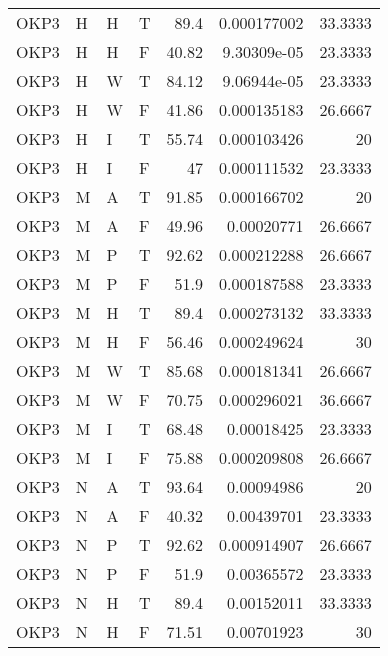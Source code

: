 \begin{longtable}{llllrrr}
    OKP3     & H     & H     & T          & 89.4       & 0.000177002 & 33.3333  \\
    OKP3     & H     & H     & F          & 40.82      & 9.30309e-05 & 23.3333  \\
    OKP3     & H     & W     & T          & 84.12      & 9.06944e-05 & 23.3333  \\
    OKP3     & H     & W     & F          & 41.86      & 0.000135183 & 26.6667  \\
    OKP3     & H     & I     & T          & 55.74      & 0.000103426 & 20       \\
    OKP3     & H     & I     & F          & 47         & 0.000111532 & 23.3333  \\
    OKP3     & M     & A     & T          & 91.85      & 0.000166702 & 20       \\
    OKP3     & M     & A     & F          & 49.96      & 0.00020771  & 26.6667  \\
    OKP3     & M     & P     & T          & 92.62      & 0.000212288 & 26.6667  \\
    OKP3     & M     & P     & F          & 51.9       & 0.000187588 & 23.3333  \\
    OKP3     & M     & H     & T          & 89.4       & 0.000273132 & 33.3333  \\
    OKP3     & M     & H     & F          & 56.46      & 0.000249624 & 30       \\
    OKP3     & M     & W     & T          & 85.68      & 0.000181341 & 26.6667  \\
    OKP3     & M     & W     & F          & 70.75      & 0.000296021 & 36.6667  \\
    OKP3     & M     & I     & T          & 68.48      & 0.00018425  & 23.3333  \\
    OKP3     & M     & I     & F          & 75.88      & 0.000209808 & 26.6667  \\
    OKP3     & N     & A     & T          & 93.64      & 0.00094986  & 20       \\
    OKP3     & N     & A     & F          & 40.32      & 0.00439701  & 23.3333  \\
    OKP3     & N     & P     & T          & 92.62      & 0.000914907 & 26.6667  \\
    OKP3     & N     & P     & F          & 51.9       & 0.00365572  & 23.3333  \\
    OKP3     & N     & H     & T          & 89.4       & 0.00152011  & 33.3333  \\
    OKP3     & N     & H     & F          & 71.51      & 0.00701923  & 30       \\

\end{longtable}
